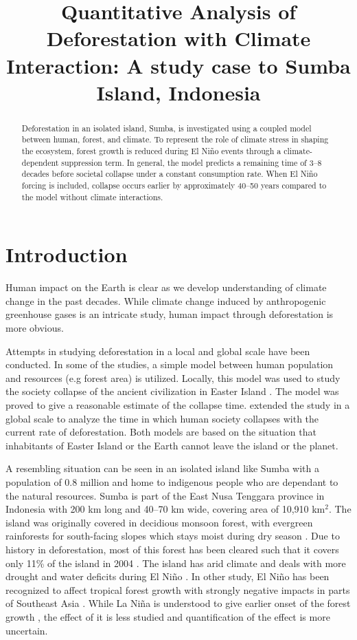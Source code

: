 \documentclass{style}
\title{Quantitative Analysis of Deforestation with Climate Interaction: A study case to Sumba Island, Indonesia}
\affiliation{
    Biogeochemical Cycles Course \\ Earth System Physics \\ The Abdus Salam International Centre of Theoretical Physics
}
\begin{document}
\maketitle

\begin{abstract}
Deforestation in an isolated island, Sumba, is investigated using a coupled model between human, forest, and climate. To represent the role of climate stress in shaping the ecosystem, forest growth is reduced during El Niño events through a climate-dependent suppression term. In general, the model predicts a remaining time of 3--8 decades before societal collapse under a constant consumption rate. When El Niño forcing is included, collapse occurs earlier by approximately 40--50 years compared to the model without climate interactions.
\end{abstract}

\printkeywords

\tmsceendfrontmatter

\section{Introduction}
Human impact on the Earth is clear as we develop understanding of climate change in the past decades. While climate change induced by anthropogenic greenhouse gases is an intricate study, human impact through deforestation is more obvious.

Attempts in studying deforestation in a local and global scale have been conducted. In some of the studies, a simple model between human population and resources (e.g forest area) is utilized. Locally, this model was used to study the society collapse of the ancient civilization in Easter Island \cite{bologna2008simple}. The model was proved to give a reasonable estimate of the collapse time. \cite{bologna2020deforestation} extended the study in a global scale to analyze the time in which human society collapses with the current rate of deforestation. Both models are based on the situation that inhabitants of Easter Island or the Earth cannot leave the island or the planet.

A resembling situation can be seen in an isolated island like Sumba with a population of 0.8 million and home to indigenous people who are dependant to the natural resources. Sumba is part of the East Nusa Tenggara province in Indonesia with 200 km long and 40--70 km wide, covering area of 10,910 km${}^{2}$. The island was originally covered in decidious monsoon forest, with evergreen rainforests for south-facing slopes which stays moist during dry season \cite{fire}. Due to history in deforestation, most of this forest has been cleared such that it covers only 11\% of the island in 2004 \cite{forest_sumba}. The island has arid climate and deals with more drought and water deficits during El Niño \cite{elnino_sumba}. In other study, El Niño has been recognized to affect tropical forest growth with strongly negative impacts in parts of Southeast Asia \cite{enso_forest}. While La Niña is understood to give earlier onset of the forest growth \cite{growing_season}, the effect of it is less studied and quantification of the effect is more uncertain.
\end{document}
